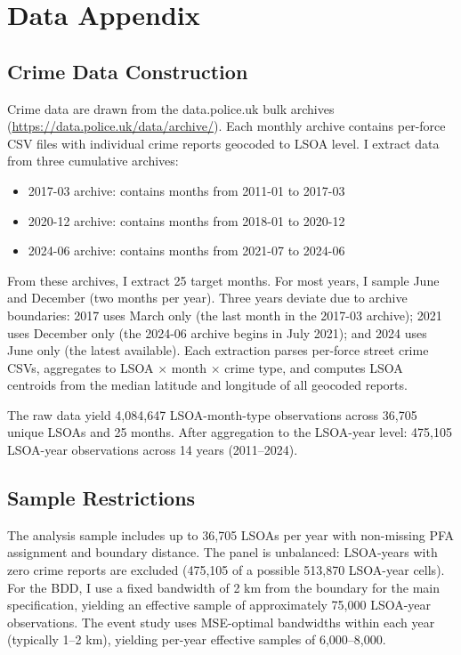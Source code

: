 \documentclass[12pt]{article}
\begin{document}
\section{Data Appendix}

\subsection{Crime Data Construction}

Crime data are drawn from the data.police.uk bulk archives (\url{https://data.police.uk/data/archive/}). Each monthly archive contains per-force CSV files with individual crime reports geocoded to LSOA level. I extract data from three cumulative archives:

\begin{itemize}
    \item 2017-03 archive: contains months from 2011-01 to 2017-03
    \item 2020-12 archive: contains months from 2018-01 to 2020-12
    \item 2024-06 archive: contains months from 2021-07 to 2024-06
\end{itemize}

From these archives, I extract 25 target months. For most years, I sample June and December (two months per year). Three years deviate due to archive boundaries: 2017 uses March only (the last month in the 2017-03 archive); 2021 uses December only (the 2024-06 archive begins in July 2021); and 2024 uses June only (the latest available). Each extraction parses per-force street crime CSVs, aggregates to LSOA $\times$ month $\times$ crime type, and computes LSOA centroids from the median latitude and longitude of all geocoded reports.

The raw data yield 4,084,647 LSOA-month-type observations across 36,705 unique LSOAs and 25 months. After aggregation to the LSOA-year level: 475,105 LSOA-year observations across 14 years (2011--2024).

\subsection{Sample Restrictions}

The analysis sample includes up to 36,705 LSOAs per year with non-missing PFA assignment and boundary distance. The panel is unbalanced: LSOA-years with zero crime reports are excluded (475,105 of a possible 513,870 LSOA-year cells). For the BDD, I use a fixed bandwidth of 2 km from the boundary for the main specification, yielding an effective sample of approximately 75,000 LSOA-year observations. The event study uses MSE-optimal bandwidths within each year (typically 1--2 km), yielding per-year effective samples of 6,000--8,000.
\end{document}
